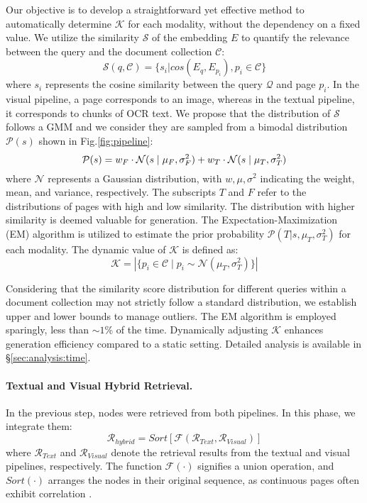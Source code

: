 Our objective is to develop a straightforward yet effective method to automatically determine $\mathcal{K}$ for each modality, without the dependency on a fixed value. We utilize the similarity $\mathcal{S}$ of the embedding $E$ to quantify the relevance between the query and the document collection $\mathcal{C}$:
\begin{equation}
\mathcal{S}(q, \mathcal{C}) = \{s_i | cos(E_q,E_{p_i}) , p_i \in \mathcal{C}\}
\end{equation}
where $s_i$ represents the cosine similarity between the query $\mathcal{Q}$ and page $p_i$. In the visual pipeline, a page corresponds to an image, whereas in the textual pipeline, it corresponds to chunks of OCR text. We propose that the distribution of $\mathcal{S}$ follows a GMM and we consider they are sampled from a bimodal distribution $\mathcal{P}(s)$ shown in Fig.\ref{fig:pipeline}:
\begin{equation}
\small \mathcal{P}(s) = w_F \cdot \mathcal{N}(s \mid \mu_F, \sigma_F^2) + w_T \cdot \mathcal{N}(s \mid \mu_T, \sigma_T^2) \label{eq:gaussian}
\end{equation}
where $\mathcal{N}$ represents a Gaussian distribution, with $w,\mu,\sigma^2$ indicating the weight, mean, and variance, respectively. The subscripts $T$ and $F$ refer to the distributions of pages with high and low similarity. The distribution with higher similarity is deemed valuable for generation. The Expectation-Maximization (EM) algorithm is utilized to estimate the prior probability $\mathcal{P}(T|s, \mu_T, \sigma_T^2)$ for each modality. The dynamic value of $\mathcal{K}$ is defined as:
\begin{equation}
\mathcal{K} = | \{ p_i \in \mathcal{C} \mid p_i \sim \mathcal{N}(\mu_T, \sigma_T^2) \} |
\end{equation}

Considering that the similarity score distribution for different queries within a document collection may not strictly follow a standard distribution, we establish upper and lower bounds to manage outliers. The EM algorithm is employed sparingly, less than $\sim 1\%$ of the time. Dynamically adjusting $\mathcal{K}$ enhances generation efficiency compared to a static setting. Detailed analysis is available in \S \ref{sec:analysis:time}.

\paragraph{Textual and Visual Hybrid Retrieval.}
In the previous step, nodes were retrieved from both pipelines. In this phase, we integrate them:
\begin{equation}
\mathcal{R}_{hybrid} = Sort[\mathcal{F}(\mathcal{R}_{Text},\mathcal{R}_{Visual})]
\end{equation}
where $\mathcal{R}_{Text}$ and $\mathcal{R}_{Visual}$ denote the retrieval results from the textual and visual pipelines, respectively. The function $\mathcal{F}(\cdot)$ signifies a union operation, and $Sort(\cdot)$ arranges the nodes in their original sequence, as continuous pages often exhibit correlation \cite{yu2024defense}. 

